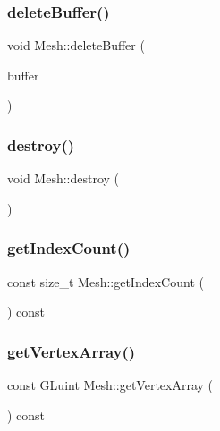 \subsubsection{\texorpdfstring{delete\+Buffer()}{deleteBuffer()}}
{\footnotesize\ttfamily void Mesh\+::delete\+Buffer (\begin{DoxyParamCaption}\item[{G\+Luint $\ast$}]{buffer }\end{DoxyParamCaption})}

\mbox{\label{class_mesh_a339f2160c7610b1106c0fd5e9c033788}} 
\subsubsection{\texorpdfstring{destroy()}{destroy()}}
{\footnotesize\ttfamily void Mesh\+::destroy (\begin{DoxyParamCaption}{ }\end{DoxyParamCaption})}

\mbox{\label{class_mesh_ae299279000ab9c85a2e62a749f660edb}} 
\subsubsection{\texorpdfstring{get\+Index\+Count()}{getIndexCount()}}
{\footnotesize\ttfamily const size\+\_\+t Mesh\+::get\+Index\+Count (\begin{DoxyParamCaption}{ }\end{DoxyParamCaption}) const\hspace{0.3cm}{\ttfamily [inline]}}

\mbox{\label{class_mesh_a08163c6f3f5bed272777fd180737eabd}} 
\subsubsection{\texorpdfstring{get\+Vertex\+Array()}{getVertexArray()}}
{\footnotesize\ttfamily const G\+Luint Mesh\+::get\+Vertex\+Array (\begin{DoxyParamCaption}{ }\end{DoxyParamCaption}) const\hspace{0.3cm}{\ttfamily [inline]}}

